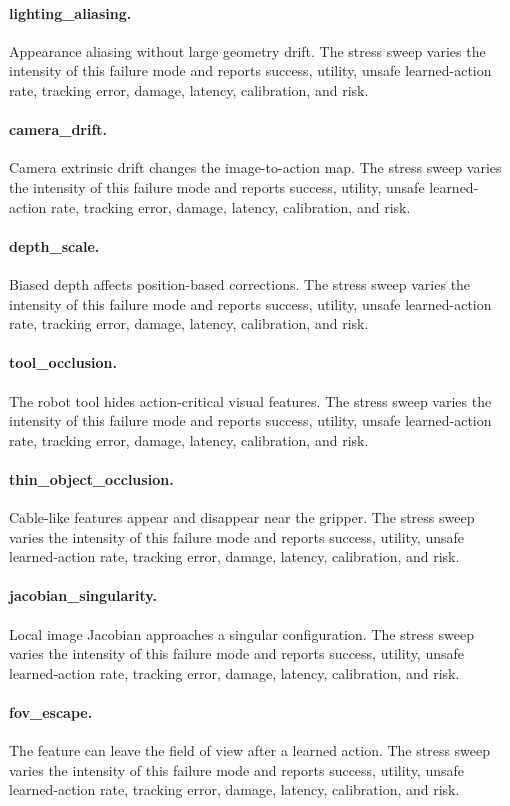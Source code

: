 \documentclass{article}
\begin{document}
\paragraph{lighting\_aliasing.} Appearance aliasing without large geometry drift.
The stress sweep varies the intensity of this failure mode and reports success, utility, unsafe learned-action rate, tracking error, damage, latency, calibration, and risk.
\paragraph{camera\_drift.} Camera extrinsic drift changes the image-to-action map.
The stress sweep varies the intensity of this failure mode and reports success, utility, unsafe learned-action rate, tracking error, damage, latency, calibration, and risk.
\paragraph{depth\_scale.} Biased depth affects position-based corrections.
The stress sweep varies the intensity of this failure mode and reports success, utility, unsafe learned-action rate, tracking error, damage, latency, calibration, and risk.
\paragraph{tool\_occlusion.} The robot tool hides action-critical visual features.
The stress sweep varies the intensity of this failure mode and reports success, utility, unsafe learned-action rate, tracking error, damage, latency, calibration, and risk.
\paragraph{thin\_object\_occlusion.} Cable-like features appear and disappear near the gripper.
The stress sweep varies the intensity of this failure mode and reports success, utility, unsafe learned-action rate, tracking error, damage, latency, calibration, and risk.
\paragraph{jacobian\_singularity.} Local image Jacobian approaches a singular configuration.
The stress sweep varies the intensity of this failure mode and reports success, utility, unsafe learned-action rate, tracking error, damage, latency, calibration, and risk.
\paragraph{fov\_escape.} The feature can leave the field of view after a learned action.
The stress sweep varies the intensity of this failure mode and reports success, utility, unsafe learned-action rate, tracking error, damage, latency, calibration, and risk.
\end{document}

